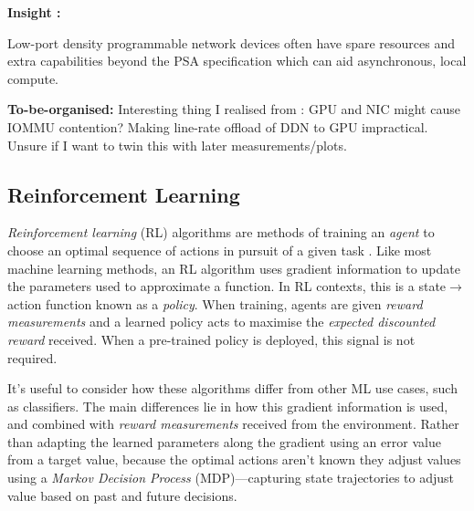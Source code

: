 \documentclass[sigconf,natbib=false]{acmart}
\newcommand{\fakepara}[1]{\noindent\textbf{#1:}}
\newcounter{insightc}
\newenvironment{insight}
	{
		\begin{tipblock}\refstepcounter{insightc}\textbf{Insight \theinsightc:}\em
	}
	{
		\end{tipblock}
	}
\begin{document}
\begin{insight}
	Low-port density programmable network devices often have spare resources and extra capabilities beyond the PSA specification which can aid asynchronous, local compute.
\end{insight}

\fakepara{To-be-organised}
Interesting thing I realised from \textcite{DBLP:conf/sigcomm/NeugebauerAZAL018}: GPU and NIC might cause IOMMU contention? Making line-rate offload of DDN to GPU impractical. Unsure if I want to twin this with later measurements/plots.

\subsection{Reinforcement Learning}
\emph{Reinforcement learning} (RL) algorithms are methods of training an \emph{agent} to choose an optimal sequence of actions in pursuit of a given task \cite{RL2E}.
Like most machine learning methods, an RL algorithm uses gradient information to update the parameters used to approximate a function.
In RL contexts, this is a state$\rightarrow$action function known as a \emph{policy}.
When training, agents are given \emph{reward measurements} and a learned policy acts to maximise the \emph{expected discounted reward} received.
When a pre-trained policy is deployed, this signal is not required.

It's useful to consider how these algorithms differ from other ML use cases, such as classifiers.
The main differences lie in how this gradient information is used, and combined with \emph{reward measurements} received from the environment.
Rather than adapting the learned parameters along the gradient using an error value from a target value, because the optimal actions aren't known they adjust values using a \emph{Markov Decision Process} (MDP)---capturing state trajectories to adjust value based on past and future decisions.
\end{document}
